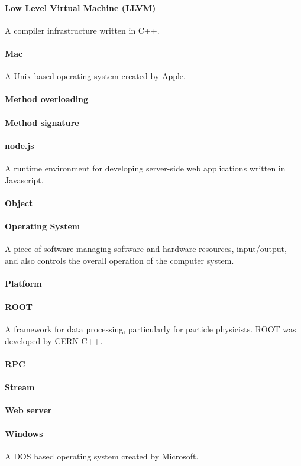 \paragraph{Low Level Virtual Machine (LLVM)}
A compiler infrastructure written in C++.
\paragraph{Mac}
A Unix based operating system created by Apple.
\paragraph{Method overloading}

\paragraph{Method signature}

\paragraph{node.js}
A runtime environment for developing server-side web applications written in Javascript. 

\paragraph{Object}

\paragraph{Operating System}
A piece of software managing software and hardware resources, input/output, and also controls the overall operation of the computer system.
\paragraph{Platform}

\paragraph{ROOT}
A framework for data processing, particularly for particle physicists. ROOT was developed by CERN C++.


\paragraph{RPC}

\paragraph{Stream}

\paragraph{Web server}

\paragraph{Windows}
A DOS based operating system created by Microsoft.
